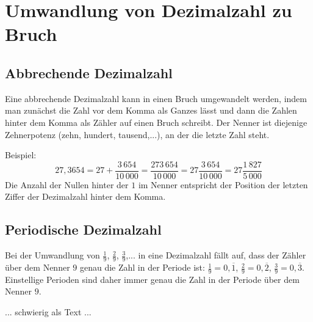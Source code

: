 \section{Umwandlung von Dezimalzahl zu Bruch}\vspace{-1em}
\subsection{Abbrechende Dezimalzahl}\vspace{-1em}
Eine abbrechende Dezimalzahl kann in einen Bruch umgewandelt werden, indem man zunächst die Zahl vor dem Komma als Ganzes lässt und dann die Zahlen hinter dem Komma als Zähler auf einen Bruch schreibt. Der Nenner ist diejenige Zehnerpotenz (zehn, hundert, tausend,...), an der die letzte Zahl steht.

Beispiel:
\begin{equation*}
	27{,}3654=27+\frac{3\,654}{10\,000}= \frac{273\,654}{10\,000}=27\frac{3\,654}{10\,000}=27\frac{1\,827}{5\,000}
\end{equation*}
Die Anzahl der Nullen hinter der $1$ im Nenner entspricht der Position der letzten Ziffer der Dezimalzahl hinter dem Komma.

\subsection{Periodische Dezimalzahl}\vspace{-1em}
Bei der Umwandlung von $\frac{1}{9}$, $\frac{2}{9}$, $\frac{3}{9}$,... in eine Dezimalzahl fällt auf, dass der Zähler über dem Nenner $9$ genau die Zahl in der Periode ist:
$\frac{1}{9}=0{,}\overline{1}$, $\frac{2}{9}=0{,}\overline{2}$, $\frac{3}{9}=0{,}\overline{3}$. Einstellige Perioden sind daher immer genau die Zahl in der Periode über dem Nenner $9$.

... schwierig als Text ... 